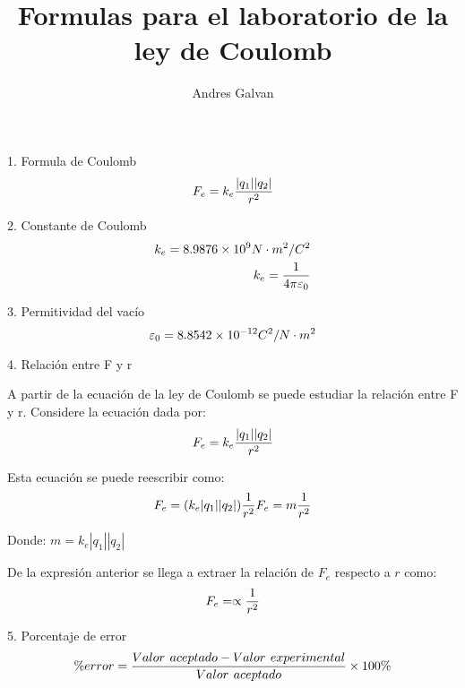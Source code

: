 \documentclass{article}
\title{Formulas para el laboratorio de la ley de Coulomb}
\author{Andres Galvan}
\begin{document}
\maketitle

1. Formula de Coulomb
\begin{equation}
    \large F_{e} = k_{e}\frac{|q_{1}||q_{2}|}{r^{2}}
\end{equation}

2. Constante de Coulomb
\begin{equation}
\begin{split}
    \large k_{e} = 8.9876 \times 10^{9}N \cdot m^{2}/C^{2} \\
    \large k_{e} = \frac{1}{4\pi \varepsilon_{0} }
\end{split}
\end{equation}

3. Permitividad del vacío
\begin{equation}
    \large \varepsilon_{0} = 8.8542 \times 10^{-12}C^2/N\cdot m^2
\end{equation}

4. Relación entre F y r

A partir de la ecuación de la ley de Coulomb se puede estudiar la relación entre F 
y r. Considere la ecuación dada por:
\begin{equation}
    \large F_{e} = k_{e}\frac{|q_{1}||q_{2}|}{r^{2}}
\end{equation}

Esta ecuación se puede reescribir como: 
\begin{equation}
    \large F_{e} = (k_{e}|q_{1}||q_{2}|)\frac{1}{r^{2}}
    \large F_{e} = m\frac{1}{r^{2}}
\end{equation}

Donde: $m = k_{e}|q_{1}||q_{2}|$

De la expresión anterior se llega a extraer la relación de $F_{e}$ respecto a  $r$ como: 
\begin{equation}
    \large F_{e} = \propto \frac{1}{r^{2}}
\end{equation}

5. Porcentaje de error
\begin{equation}
    \large \% error = \frac{Valor\ aceptado - Valor\ experimental}{Valor\ aceptado} \times 100\%
\end{equation}
\end{document}
